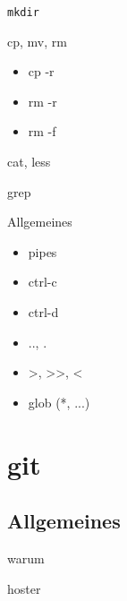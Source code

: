 \documentclass[t]{beamer}
\begin{document}
      \begin{frame}{\texttt{mkdir}}
      \end{frame}

      \begin{frame}{cp, mv, rm}
        \begin{itemize}
          \item cp -r\\
          \item rm -r\\
          \item rm -f
        \end{itemize}
      \end{frame}

      \begin{frame}{cat, less}
      \end{frame}

      \begin{frame}{grep}
      \end{frame}

      \begin{frame}{Allgemeines}
        \begin{itemize}
          \item pipes\\
          \item ctrl-c\\
          \item ctrl-d\\
          \item .., .\\
          \item >, >>, <\\
          \item glob (*, ...)
        \end{itemize}
      \end{frame}

  \section{git}
    \subsection{Allgemeines}
      \begin{frame}{warum}
      \end{frame}

      \begin{frame}{hoster}
      \end{frame}
\end{document}
